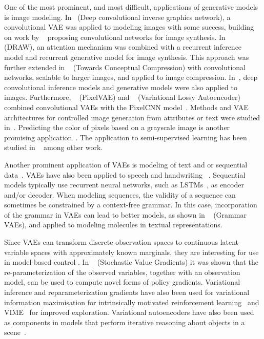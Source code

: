 \documentclass[MAL,biber]{nowfnt} %
\begin{document}
One of the most prominent, and most difficult, applications of generative models is image modeling. In~\citep{kulkarni2015deep} (Deep convolutional inverse graphics network), a convolutional VAE was applied to modeling images with some success, building on work by ~\citep{dosovitskiy2015learning} proposing convolutional networks for image synthesis. In ~\citep{gregor2015draw} (DRAW), an attention mechanism was combined with a recurrent inference model and recurrent generative model for image synthesis. This approach was further extended in ~\citep{gregor2016towards} (Towards Conceptual Compression) with convolutional networks, scalable to larger images, and applied to image compression. In~\citep{kingma2016improving}, deep convolutional inference models and generative models were also applied to images. Furthermore, ~\citep{gulrajani2016pixelvae} (PixelVAE) and ~\citep{chen2016variational} (Variational Lossy Autoencoder) combined convolutional VAEs with the PixelCNN model~\citep{pixelrnn,van2016conditional}. Methods and VAE architectures for controlled image generation from attributes or text were studied in~\citep{kingma2014semi,yan2016attribute2image,mansimov2015generating,brock2016neural,white2016sampling}. Predicting the color of pixels based on a grayscale image is another promising application~\citep{deshpande2016learning}. The application to semi-supervised learning has been studied in ~\citep{kingma2014semi,pu2016variational,xu2017variational} among other work.


Another prominent application of VAEs is modeling of text and or sequential data~\citep{bayer2014learning,bowman2015generating, serban2016hierarchical,johnson2016composing,karl2016deep,fraccaro2016sequential, miao2016neural,semeniuta2017hybrid,zhao2017learning,yang2017improved,hu2017controllable}. VAEs have also been applied to speech and handwriting ~\cite{chung2015recurrent}. Sequential models typically use recurrent neural networks, such as LSTMs~\citep{hochreiter1997long}, as encoder and/or decoder. When modeling sequences, the validity of a sequence can sometimes be constrained by a context-free grammar. In this case, incorporation of the grammar in VAEs can lead to better models, as shown in ~\citep{kusner2017grammar} (Grammar VAEs), and applied to modeling molecules in textual representations.

Since VAEs can transform discrete observation spaces to continuous latent-variable spaces with approximately known marginals, they are interesting for use in model-based control \citep{watter2015embed,pritzel2017neural}. In ~\citep{heess2015learning} (Stochastic Value Gradients) it was shown that the re-parameterization of the observed variables, together with an observation model, can be used to compute novel forms of policy gradients. Variational inference and reparameterization gradients have also been used for variational information maximisation for intrinsically motivated reinforcement learning~\citep{mohamed2015variational} and VIME~\citep{houthooft2016vime} for improved exploration.  Variational autoencoders have also been used as components in models that perform iterative reasoning about objects in a scene~\citep{eslami2016attend}.
\end{document}
